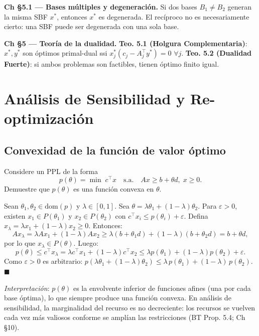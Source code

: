 \documentclass[12pt]{article}
\theoremstyle{plain}
\begin{document}
\begin{teofund}
\textbf{Ch §5.1 — Bases múltiples y degeneración.} Si dos bases $B_1\neq B_2$ generan la misma SBF $x^*$, entonces $x^*$ es degenerada. El recíproco no es necesariamente cierto: una SBF puede ser degenerada con una sola base.

\textbf{Ch §5 — Teoría de la dualidad.} \textbf{Teo. 5.1 (Holgura Complementaria)}: $x^*,y^*$ son óptimos primal-dual ssi $x^*_j(c_j-A_j^\top y^*)=0$ $\forall j$. \textbf{Teo. 5.2 (Dualidad Fuerte)}: si ambos problemas son factibles, tienen óptimo finito igual.
\end{teofund}

\bigskip

\section{Análisis de Sensibilidad y Re-optimización}

\subsection{Convexidad de la función de valor óptimo}

Considere un PPL de la forma
\[
      p(\theta) = \min\; c^{\top}x \quad \text{s.a.} \quad Ax \geq b + \theta d,\; x \geq 0.
\]
Demuestre que $p(\theta)$ es una función convexa en $\theta$.

\begin{solucion}

Sean $\theta_1,\theta_2\in\mathrm{dom}(p)$ y $\lambda\in[0,1]$. Sea $\theta=\lambda\theta_1+(1-\lambda)\theta_2$. Para $\varepsilon>0$, existen $x_1\in P(\theta_1)$ y $x_2\in P(\theta_2)$ con $c^\top x_i\leq p(\theta_i)+\varepsilon$. Defina $x_\lambda=\lambda x_1+(1-\lambda)x_2\geq 0$. Entonces:
\[
Ax_\lambda = \lambda Ax_1+(1-\lambda)Ax_2 \geq \lambda(b+\theta_1 d)+(1-\lambda)(b+\theta_2 d) = b+\theta d,
\]
por lo que $x_\lambda\in P(\theta)$. Luego:
\[
p(\theta) \leq c^\top x_\lambda = \lambda c^\top x_1+(1-\lambda)c^\top x_2 \leq \lambda p(\theta_1)+(1-\lambda)p(\theta_2)+\varepsilon.
\]
Como $\varepsilon>0$ es arbitrario: $p(\lambda\theta_1+(1-\lambda)\theta_2)\leq\lambda\,p(\theta_1)+(1-\lambda)\,p(\theta_2)$. $\blacksquare$

\textit{Interpretación}: $p(\theta)$ es la envolvente inferior de funciones afines (una por cada base óptima), lo que siempre produce una función convexa. En análisis de sensibilidad, la marginalidad del recurso es no decreciente: los recursos se vuelven cada vez más valiosos conforme se amplían las restricciones (BT Prop. 5.4; Ch §10).

\end{solucion}
\end{document}
